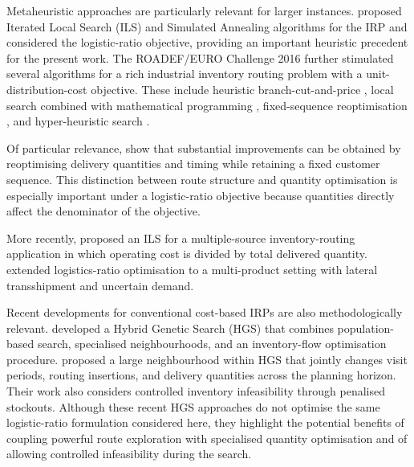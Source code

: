 \documentclass{article}
\begin{document}
Metaheuristic approaches are particularly relevant for larger instances.
\cite{alvarez2018iterated} proposed Iterated Local Search (ILS) and Simulated
Annealing algorithms for the IRP and considered the logistic-ratio objective,
providing an important heuristic precedent for the present work. The
ROADEF/EURO Challenge 2016 further stimulated several algorithms for a rich
industrial inventory routing problem with a unit-distribution-cost objective.
These include heuristic branch-cut-and-price
\citep{absi2020branch}, local search combined with mathematical programming
\citep{su2020matheuristic}, fixed-sequence reoptimisation
\citep{he2020fixedsequence}, and hyper-heuristic search
\citep{kheiri2020heuristic}.

Of particular relevance, \cite{he2020fixedsequence} show that substantial
improvements can be obtained by reoptimising delivery quantities and timing
while retaining a fixed customer sequence. This distinction between route
structure and quantity optimisation is especially important under a
logistic-ratio objective because quantities directly affect the denominator
of the objective.

More recently, \cite{alonsopecina2024iterated} proposed an ILS for a
multiple-source inventory-routing application in which operating cost is
divided by total delivered quantity. \cite{man2025logistics} extended
logistics-ratio optimisation to a multi-product setting with lateral
transshipment and uncertain demand.

Recent developments for conventional cost-based IRPs are also methodologically
relevant. \cite{castro2026hybrid} developed a Hybrid Genetic Search (HGS) that
combines population-based search, specialised neighbourhoods, and an
inventory-flow optimisation procedure. \cite{zhao2025large} proposed a large
neighbourhood within HGS that jointly changes visit periods, routing
insertions, and delivery quantities across the planning horizon. Their work
also considers controlled inventory infeasibility through penalised
stockouts. Although these recent HGS approaches do not optimise the same
logistic-ratio formulation considered here, they highlight the potential
benefits of coupling powerful route exploration with specialised quantity
optimisation and of allowing controlled infeasibility during the search.
\end{document}

